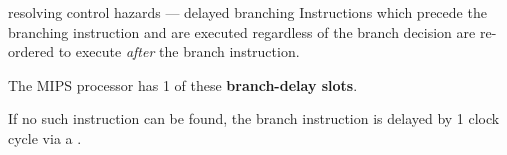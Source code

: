 \begin{defn}{resolving control hazards --- delayed branching}
    Instructions which precede the branching instruction and are executed regardless of the
    branch decision are re-ordered to execute \textit{after} the branch instruction.

    The MIPS processor has 1 of these \textbf{branch-delay slots}.

    If no such instruction can be found, the branch instruction is delayed by 1 clock cycle
    via a .
\end{defn}

